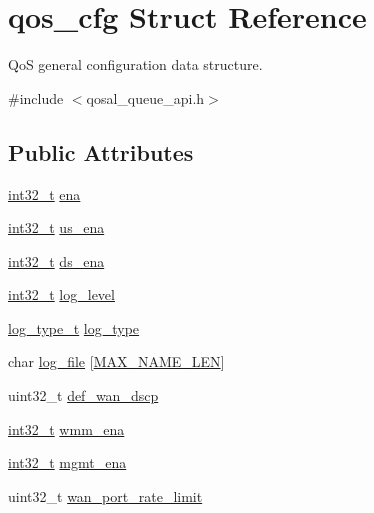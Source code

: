 \hypertarget{structqos__cfg}{\section{qos\-\_\-cfg Struct Reference}
\label{structqos__cfg}
}


Qo\-S general configuration data structure.  




{\ttfamily \#include $<$qosal\-\_\-queue\-\_\-api.\-h$>$}

\subsection*{Public Attributes}
\begin{DoxyCompactItemize}
\item 
\hyperlink{commondefs_8h_a32f2e37ee053cf2ce8ca28d1f74630e5}{int32\-\_\-t} \hyperlink{structqos__cfg_a249977e1be92f8e9725e755a52065828}{ena}
\item 
\hyperlink{commondefs_8h_a32f2e37ee053cf2ce8ca28d1f74630e5}{int32\-\_\-t} \hyperlink{structqos__cfg_acad8e74b9b0261e29631422506b0d73f}{us\-\_\-ena}
\item 
\hyperlink{commondefs_8h_a32f2e37ee053cf2ce8ca28d1f74630e5}{int32\-\_\-t} \hyperlink{structqos__cfg_a59c290fbf8b95e2f08674c8d3565531d}{ds\-\_\-ena}
\item 
\hyperlink{commondefs_8h_a32f2e37ee053cf2ce8ca28d1f74630e5}{int32\-\_\-t} \hyperlink{structqos__cfg_a382d14c25eaeaf4f01950a06336314ba}{log\-\_\-level}
\item 
\hyperlink{group__FAPI__QOS__GENERAL_gaf8da7b968cb9659aef1acb8c79ff7250}{log\-\_\-type\-\_\-t} \hyperlink{structqos__cfg_a6e170fd5d9d374ad405021dae66c7f93}{log\-\_\-type}
\item 
char \hyperlink{structqos__cfg_aafe2164e01390853b819a90181ca1c22}{log\-\_\-file} \mbox{[}\hyperlink{group__FAPI__SYSTEM_gafd709f201d7643c3909621f620ea648a}{M\-A\-X\-\_\-\-N\-A\-M\-E\-\_\-\-L\-E\-N}\mbox{]}
\item 
uint32\-\_\-t \hyperlink{structqos__cfg_aca196127a157dc22a75c9fc1a9abb124}{def\-\_\-wan\-\_\-dscp}
\item 
\hyperlink{commondefs_8h_a32f2e37ee053cf2ce8ca28d1f74630e5}{int32\-\_\-t} \hyperlink{structqos__cfg_a79c7b6853d2eb702f01a5f9412acc887}{wmm\-\_\-ena}
\item 
\hyperlink{commondefs_8h_a32f2e37ee053cf2ce8ca28d1f74630e5}{int32\-\_\-t} \hyperlink{structqos__cfg_af61eb747637f5d2f4db1d09362b8b9f4}{mgmt\-\_\-ena}
\item 
uint32\-\_\-t \hyperlink{structqos__cfg_a61020b43790df2ef68593160680ebc5d}{wan\-\_\-port\-\_\-rate\-\_\-limit}
\end{DoxyCompactItemize}


